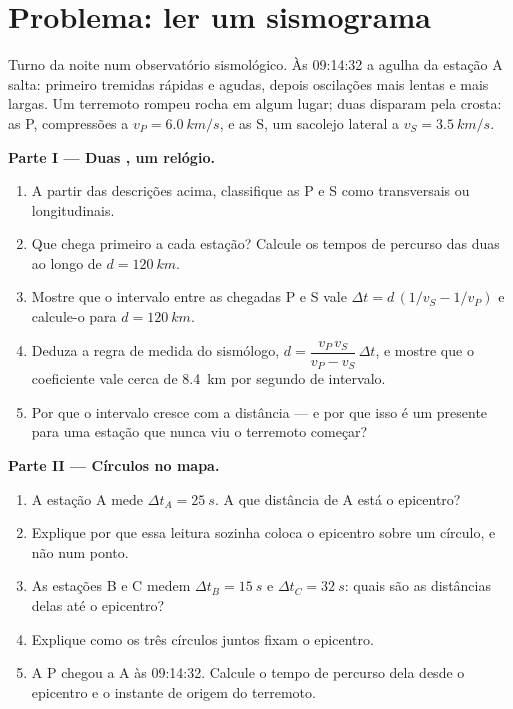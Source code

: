 \section{Problema: ler um sismograma}

\begin{problem}
\label{pb:g12:mechanical-waves:1}
Turno da noite num observatório sismológico. Às 09:14:32 a agulha da
estação A salta: primeiro tremidas rápidas e agudas, depois oscilações
mais lentas e mais largas. Um terremoto rompeu rocha em algum lugar; duas
 disparam pela crosta: as  P, compressões a
$v_P = \qty{6.0}{km/s}$, e as  S, um sacolejo lateral a
$v_S = \qty{3.5}{km/s}$.

\medskip
\noindent\textbf{Parte I --- Duas , um relógio.}
\begin{enumerate}
  \item A partir das descrições acima, classifique as  P e S como
        transversais ou longitudinais.
  \item Que  chega primeiro a cada estação? Calcule os tempos de
        percurso das duas ao longo de $d = \qty{120}{km}$.
  \item Mostre que o intervalo entre as chegadas P e S vale
        $\Delta t = d\,(1/v_S - 1/v_P)$ e calcule-o para
        $d = \qty{120}{km}$.
  \item Deduza a regra de medida do sismólogo,
        $d = \dfrac{v_P\,v_S}{v_P - v_S}\,\Delta t$, e mostre que o
        coeficiente vale cerca de \qty{8.4}{km} por segundo de
        intervalo.
  \item Por que o intervalo cresce com a distância --- e por que isso é
        um presente para uma estação que nunca viu o terremoto começar?
\end{enumerate}

\medskip
\noindent\textbf{Parte II --- Círculos no mapa.}
\begin{enumerate}[resume]
  \item A estação A mede $\Delta t_A = \qty{25}{s}$. A que distância de A
        está o epicentro?
  \item Explique por que essa leitura sozinha coloca o epicentro sobre um
        círculo, e não num ponto.
  \item As estações B e C medem $\Delta t_B = \qty{15}{s}$ e
        $\Delta t_C = \qty{32}{s}$: quais são as distâncias delas até o
        epicentro?
  \item Explique como os três círculos juntos fixam o epicentro.
  \item A  P chegou a A às 09:14:32. Calcule o tempo de percurso dela
        desde o epicentro e o instante de origem do terremoto.
\end{enumerate}


\end{problem}
